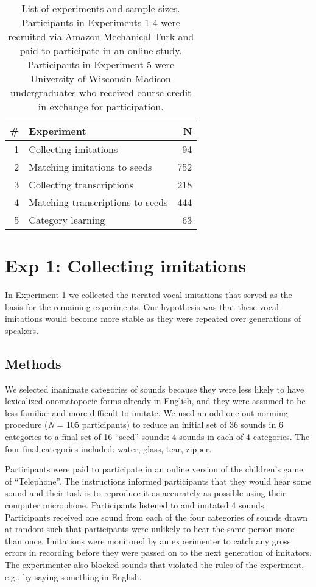 \documentclass[10pt,letterpaper]{article}
\begin{document}
\begin{table}

\caption{\label{tab:table1}List of experiments and sample sizes. Participants in Experiments 1-4 were recruited via Amazon Mechanical Turk and paid to participate in an online study. Participants in Experiment 5 were University of Wisconsin-Madison undergraduates who received course credit in exchange for participation.}
\centering
\begin{tabular}[t]{rlr}
\toprule
\# & Experiment & N\\
\midrule
1 & Collecting imitations & 94\\
2 & Matching imitations to seeds & 752\\
3 & Collecting transcriptions & 218\\
4 & Matching transcriptions to seeds & 444\\
5 & Category learning & 63\\
\bottomrule
\end{tabular}
\end{table}

\section{Exp 1: Collecting
imitations}\label{exp-1-collecting-imitations}

In Experiment 1 we collected the iterated vocal imitations that served
as the basis for the remaining experiments. Our hypothesis was that
these vocal imitations would become more stable as they were repeated
over generations of speakers.

\subsection{Methods}\label{methods}

We selected inanimate categories of sounds because they were less likely
to have lexicalized onomatopoeic forms already in English, and they were
assumed to be less familiar and more difficult to imitate. We used an
odd-one-out norming procedure (\emph{N} = 105 participants) to reduce an
initial set of 36 sounds in 6 categories to a final set of 16 ``seed''
sounds: 4 sounds in each of 4 categories. The four final categories
included: water, glass, tear, zipper.

Participants were paid to participate in an online version of the
children's game of ``Telephone''. The instructions informed participants
that they would hear some sound and their task is to reproduce it as
accurately as possible using their computer microphone. Participants
listened to and imitated 4 sounds. Participants received one sound from
each of the four categories of sounds drawn at random such that
participants were unlikely to hear the same person more than once.
Imitations were monitored by an experimenter to catch any gross errors
in recording before they were passed on to the next generation of
imitators. The experimenter also blocked sounds that violated the rules
of the experiment, e.g., by saying something in English.
\end{document}

